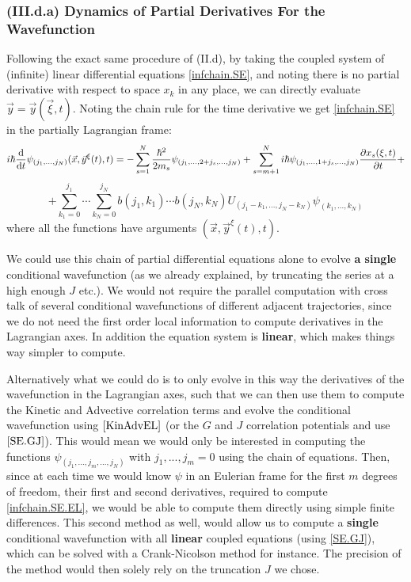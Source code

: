 \documentclass[11pt, a4paper]{article} %
\begin{document}
\subsubsection*{(III.d.a) Dynamics of Partial Derivatives For the Wavefunction}\vspace{-0.1cm}
Following the exact same procedure of (II.d), by taking the coupled system of (infinite) linear differential equations \eqref{infchain.SE}, and noting there is no partial derivative with respect to space $x_k$ in any place, we can directly evaluate $\vec{y}=\vec{y}(\vec{\xi},t)$. Noting the chain rule for the time derivative we get \eqref{infchain.SE} in the partially Lagrangian frame:\vspace{-0.1cm}
\begin{equation}\label{infchain.SE.EL}
i\hbar \dv{}{t}\psi_{(j_1,...,j_N)}(\vec{x},\vec{y}^\xi(t),t)=-\sum_{s=1}^N\frac{\hbar^2}{2m_s}\psi_{(j_1,...,2+j_s,...,j_N)}+\sum_{s=m+1}^N i\hbar \psi_{(j_1,...,1+j_s,...,j_N)} \pdv{x_s(\xi,t)}{t}+\vspace{-0.1cm}
\end{equation}
$$
+\sum_{k_1=0}^{j_1}\cdots\sum_{k_N=0}^{j_N} b(j_1,k_1)\cdots b(j_N,k_N)U_{(j_1-k_1,...,j_N-k_N)}\psi_{(k_1,...,k_N)}
$$
where all the functions have arguments $(\vec{x},\vec{y}^\xi(t),t)$.

We could use this chain of partial differential equations alone to evolve {\bf a single} conditional wavefunction (as we already explained, by truncating the series at a high enough $J$ etc.). We would not require the parallel computation with cross talk of several conditional wavefunctions of different adjacent trajectories, since we do not need the first order local information to compute derivatives in the Lagrangian axes. In addition the equation system is {\bf linear}, which makes things way simpler to compute.

Alternatively what we could do is to only evolve in this way the derivatives of the wavefunction in the Lagrangian axes, such that we can then use them to compute the Kinetic and Advective correlation terms and evolve the conditional wavefunction using $\eqref{KinAdvEL}$ (or the $G$ and $J$ correlation potentials and use $\eqref{SE.GJ}$). This would mean we would only be interested in computing the functions $\psi_{(j_1,...,j_m,...,j_N)}$ with $j_1,...,j_m=0$ using the chain of equations. Then, since at each time we would know $\psi$ in an Eulerian frame for the first $m$ degrees of freedom, their first and second derivatives, required to compute \eqref{infchain.SE.EL}, we would be able to compute them directly using simple finite differences. This second method as well, would allow us to compute a {\bf single} conditional wavefunction with all {\bf linear} coupled equations (using \eqref{SE.GJ}), which can be solved with a Crank-Nicolson method for instance. The precision of the method would then solely rely on the truncation $J$ we chose. 
\end{document}
